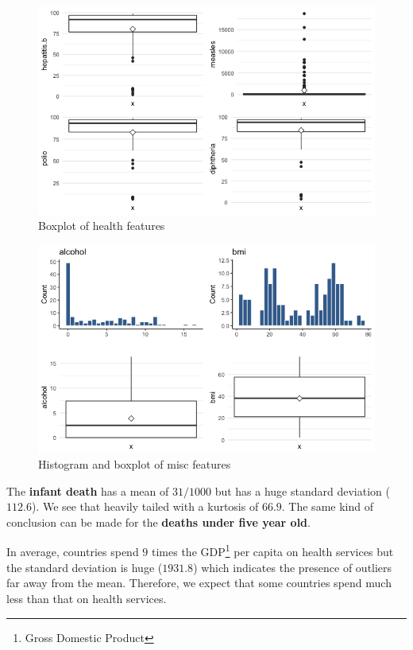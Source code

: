 \begin{figure}[H]
	\centering
	\includegraphics{figures/eda/boxplot_health_features.png}
	\caption{Boxplot of health features}
	\label{fig:boxplot_health_features}
\end{figure}


\begin{figure}[H]
	\centering
	\includegraphics{figures/eda/histogram_boxplot_misc_features.png}
	\caption{Histogram and boxplot of misc features}
	\label{fig:histogram_boxplot_misc_features}
\end{figure}


The \textbf{infant death} has a mean of $31 / 1000$ but has a huge standard deviation ($112.6$). We see that heavily tailed with a kurtosis of $66.9$. The same kind of conclusion can be made for the \textbf{deaths under five year old}.

In average, countries spend $9$ times the GDP\footnote{Gross Domestic Product} per capita on health services but the standard deviation is huge ($1931.8$) which indicates the presence of outliers far away from the mean. Therefore, we expect that some countries spend much less than that on health services.


